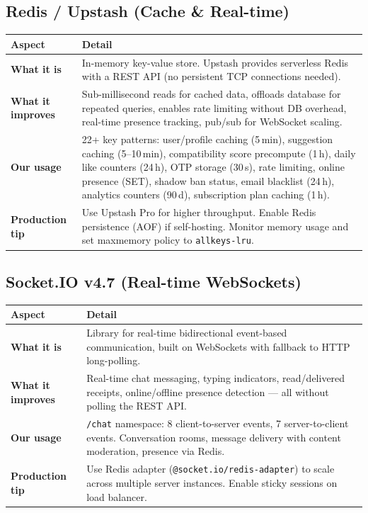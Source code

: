 \documentclass[a4paper,11pt]{article}
\begin{document}
\subsection{Redis / Upstash (Cache \& Real-time)}

\begin{longtable}{L{3.5cm} L{11.5cm}}
\toprule
\textbf{Aspect} & \textbf{Detail} \\
\midrule
\endhead
\textbf{What it is} & In-memory key-value store. Upstash provides serverless Redis with a REST API (no persistent TCP connections needed). \\
\midrule
\textbf{What it improves} & Sub-millisecond reads for cached data, offloads database for repeated queries, enables rate limiting without DB overhead, real-time presence tracking, pub/sub for WebSocket scaling. \\
\midrule
\textbf{Our usage} & 22+ key patterns: user/profile caching (5\,min), suggestion caching (5--10\,min), compatibility score precompute (1\,h), daily like counters (24\,h), OTP storage (30\,s), rate limiting, online presence (SET), shadow ban status, email blacklist (24\,h), analytics counters (90\,d), subscription plan caching (1\,h). \\
\midrule
\textbf{Production tip} & Use Upstash Pro for higher throughput. Enable Redis persistence (AOF) if self-hosting. Monitor memory usage and set maxmemory policy to \texttt{allkeys-lru}. \\
\bottomrule
\end{longtable}

\subsection{Socket.IO v4.7 (Real-time WebSockets)}

\begin{longtable}{L{3.5cm} L{11.5cm}}
\toprule
\textbf{Aspect} & \textbf{Detail} \\
\midrule
\endhead
\textbf{What it is} & Library for real-time bidirectional event-based communication, built on WebSockets with fallback to HTTP long-polling. \\
\midrule
\textbf{What it improves} & Real-time chat messaging, typing indicators, read/delivered receipts, online/offline presence detection --- all without polling the REST API. \\
\midrule
\textbf{Our usage} & \texttt{/chat} namespace: 8 client-to-server events, 7 server-to-client events. Conversation rooms, message delivery with content moderation, presence via Redis. \\
\midrule
\textbf{Production tip} & Use Redis adapter (\texttt{@socket.io/redis-adapter}) to scale across multiple server instances. Enable sticky sessions on load balancer. \\
\bottomrule
\end{longtable}
\end{document}
